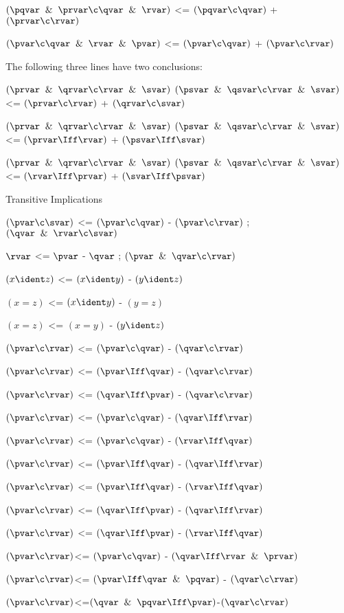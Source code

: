 $(\pqvar \And \prvar\c \qvar \And \rvar)$ <= $(\pqvar \c \qvar)$ + $(\prvar \c \rvar)$

$(\pvar \c \qvar \And \rvar \And \pvar)$ <= $(\pvar \c \qvar)$ + $(\pvar \c \rvar)$

The following three lines have two conclusions:

$(\prvar \And \qrvar\c\rvar \And \svar)$  $(\psvar \And \qsvar\c \rvar \And \svar)$ <= $(\prvar\c \rvar)$ + $(\qrvar \c \svar)$

$(\prvar \And \qrvar\c\rvar \And \svar)$  $(\psvar \And \qsvar\c \rvar \And \svar)$ <= $(\prvar\Iff\rvar)$ + $(\psvar\Iff\svar)$

$(\prvar \And \qrvar\c\rvar \And \svar)$  $(\psvar \And \qsvar\c \rvar \And \svar)$ <= $(\rvar\Iff\prvar)$ + $(\svar\Iff\psvar)$
\lineb 

Transitive Implications

$(\pvar \c \svar)$ <= $(\pvar \c \qvar)$ - $(\pvar \c \rvar)$ ;$(\qvar \And \rvar \c \svar)$

$\rvar$ <= $\pvar$ - $\qvar$ ; $(\pvar \And \qvar \c \rvar)$

$(x \ident z)$ <= $(x \ident y)$ - $(y \ident z)$

$(x = z)$ <= $(x \ident y)$ - $(y = z)$

$(x = z)$ <= $(x = y)$ - $(y \ident z)$

$(\pvar \c \rvar)$ <= $(\pvar\c\qvar)$ - $(\qvar\c\rvar)$

$(\pvar \c \rvar)$ <= $(\pvar\Iff\qvar)$ - $(\qvar\c\rvar)$

$(\pvar \c \rvar)$ <= $(\qvar\Iff\pvar)$ - $(\qvar\c\rvar)$

$(\pvar \c \rvar)$ <= $(\pvar\c\qvar)$ - $(\qvar\Iff\rvar)$

$(\pvar \c \rvar)$ <= $(\pvar\c\qvar)$ - $(\rvar\Iff\qvar)$

$(\pvar \c \rvar)$ <= $(\pvar\Iff\qvar)$ - $(\qvar\Iff\rvar)$

$(\pvar \c \rvar)$ <= $(\pvar\Iff\qvar)$ - $(\rvar\Iff\qvar)$

$(\pvar \c \rvar)$ <= $(\qvar\Iff\pvar)$ - $(\qvar\Iff\rvar)$

$(\pvar \c \rvar)$ <= $(\qvar\Iff\pvar)$ - $(\rvar\Iff\qvar)$

$(\pvar \c \rvar)$<= $(\pvar \c \qvar)$ - $(\qvar \Iff \rvar \And \prvar)$

$(\pvar \c \rvar)$<= $(\pvar \Iff \qvar \And \pqvar)$ - $(\qvar \c \rvar)$

$(\pvar \c\rvar )$<=$(\qvar \And \pqvar\Iff \pvar)$-$(\qvar \c \rvar)$

